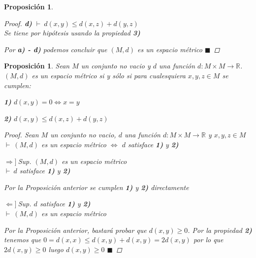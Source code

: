 \documentclass[oneside]{book} %
\theoremstyle{Teorema}
\newtheorem{Proposicion}[Definicion]{Proposición}
\theoremstyle{Ejemplos}
\theoremstyle{[Obs]}
\renewcommand{\{}{\left\lbrace} %
\renewcommand{\}}{\right\rbrace} %
\newcommand{\R}{\mathbb{R}} %
\renewcommand{\qed}{$\blacksquare$} %
\newcommand{\pd}{$\vdash\ $} %
\newcommand{\necesidad}{$\Rightarrow]\ $} %
\newcommand{\suficiencia}{$\Leftarrow]\ $} %
\begin{document}
\begin{Proposicion}
\begin{proof}
					\textbf{d)} \pd $d(x, y) \leq d(x, z) + d(y, z)$ \\
					Se tiene por hipótesis usando la propiedad \textbf{3)}

					Por \textbf{a) - d)} podemos concluir que $(M, d)$ es un espacio métrico \qed

				\end{proof}

			\end{Proposicion}

			\begin{Proposicion}\setlength{\parindent}{0em}

				Sean $M$ un conjunto no vacio y $d$ una función $d : M \times M \to \R$. $(M, d)$ es un espacio métrico si y sólo si para cualesquiera $x, y, z \in M$ se cumplen: 

				\textbf{1)} $d(x, y) = 0 \Leftrightarrow x = y$ 

				\textbf{2)} $d(x, y) \leq d(x, z) + d(y, z)$ 

				\begin{proof}
					
					Sean $M$ un conjunto no vacio, $d$ una función $d : M \times M \to \R$ y $x, y, z \in M$ \\
					\pd $(M, d)$ es un espacio métrico $\Leftrightarrow$ $d$ satisface \textbf{1)} y \textbf{2)}

					\necesidad Sup. $(M, d)$ es un espacio métrico \\
					\pd $d$ satisface \textbf{1)} y \textbf{2)}

					Por la Proposición anterior se cumplen \textbf{1)} y \textbf{2)} directamente 

					\suficiencia Sup. $d$ satisface \textbf{1)} y \textbf{2)} \\
					\pd $(M, d)$ es un espacio métrico

					Por la Proposición anterior, bastará probar que $d(x, y) \geq 0$. Por la propiedad \textbf{2)} tenemos que $0 = d(x, x) \leq d(x, y) + d(x, y) = 2d(x, y)$ por lo que $2d(x, y) \geq 0$ luego $d(x, y) \geq 0$ \qed

				\end{proof}

			\end{Proposicion}
\end{document}
